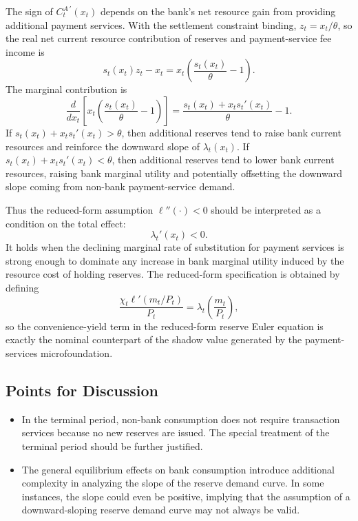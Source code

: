\documentclass[12pt]{article}
\begin{document}
The sign of $C^{A\,\prime}_t(x_t)$ depends on the bank's net resource gain from providing additional payment services. With the settlement constraint binding, $z_t=x_t/\theta$, so the real net current resource contribution of reserves and payment-service fee income is
\[
s_t(x_t)z_t-x_t
=
x_t\left(\frac{s_t(x_t)}{\theta}-1\right).
\]
The marginal contribution is
\[
\frac{d}{dx_t}
\left[
x_t\left(\frac{s_t(x_t)}{\theta}-1\right)
\right]
=
\frac{s_t(x_t)+x_t s_t'(x_t)}{\theta}-1.
\]
If $s_t(x_t)+x_t s_t'(x_t)>\theta$, then additional reserves tend to raise bank current resources and reinforce the downward slope of $\lambda_t(x_t)$. If $s_t(x_t)+x_t s_t'(x_t)<\theta$, then additional reserves tend to lower bank current resources, raising bank marginal utility and potentially offsetting the downward slope coming from non-bank payment-service demand.

Thus the reduced-form assumption $\ell''(\cdot)<0$ should be interpreted as a condition on the total effect:
\[
\lambda_t'(x_t)<0.
\]
It holds when the declining marginal rate of substitution for payment services is strong enough to dominate any increase in bank marginal utility induced by the resource cost of holding reserves. The reduced-form specification is obtained by defining
\[
\frac{\chi_t \ell'\!\left(m_t/P_t\right)}{P_t}
=
\lambda_t\!\left(\frac{m_t}{P_t}\right),
\]
so the convenience-yield term in the reduced-form reserve Euler equation is exactly the nominal counterpart of the shadow value generated by the payment-services microfoundation.


\subsection*{Points for Discussion}

\begin{itemize}
    \item In the terminal period, non-bank consumption does not require transaction services because no new reserves are issued. The special treatment of the terminal period should be further justified.
    \item The general equilibrium effects on bank consumption introduce additional complexity in analyzing the slope of the reserve demand curve. In some instances, the slope could even be positive, implying that the assumption of a downward-sloping reserve demand curve may not always be valid.
\end{itemize}
\end{document}

